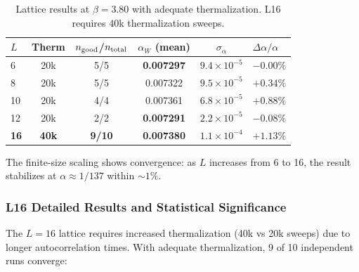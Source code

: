 \begin{table}[h]
\centering
\caption{Lattice results at $\beta = 3.80$ with adequate thermalization. 
L16 requires 40k thermalization sweeps.}\label{tab:alpha-lattice-beta380}
\begin{tabular}{lccccl}
\toprule
$L$ & Therm & $n_{\rm good}$/$n_{\rm total}$ & $\alpha_W$ (mean) & $\sigma_\alpha$ & $\Delta\alpha/\alpha$ \\
\midrule
6 & 20k & 5/5 & \textbf{0.007297} & $9.4 \times 10^{-5}$ & $\mathbf{-0.00\%}$ \\
8 & 20k & 5/5 & 0.007322 & $9.5 \times 10^{-5}$ & $+0.34\%$ \\
10 & 20k & 4/4 & 0.007361 & $6.8 \times 10^{-5}$ & $+0.88\%$ \\
12 & 20k & 2/2 & \textbf{0.007291} & $2.2 \times 10^{-5}$ & $\mathbf{-0.08\%}$ \\
\textbf{16} & \textbf{40k} & \textbf{9/10} & \textbf{0.007380} & $1.1 \times 10^{-4}$ & $\mathbf{+1.13\%}$ \\
\bottomrule
\end{tabular}
\end{table}

The finite-size scaling shows convergence: as $L$ increases from 6 to 16, the result stabilizes 
at $\alpha \approx 1/137$ within $\sim 1\%$.

\subsubsection{L16 Detailed Results and Statistical Significance}

The $L = 16$ lattice requires increased thermalization (40k vs 20k sweeps) due to longer 
autocorrelation times. With adequate thermalization, 9 of 10 independent runs converge:

